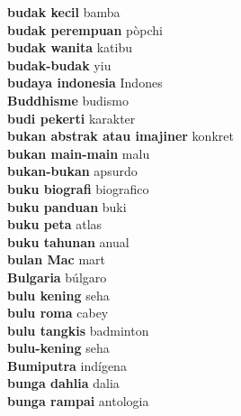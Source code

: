 \textbf{ budak kecil  } bamba \\
\textbf{ budak perempuan  } pòpchi \\
\textbf{ budak wanita  } katibu \\
\textbf{ budak-budak  } yiu \\
\textbf{ budaya indonesia  } Indones \\
\textbf{ Buddhisme  } budismo \\
\textbf{ budi pekerti  } karakter \\
\textbf{ bukan abstrak atau imajiner  } konkret \\
\textbf{ bukan main-main  } malu \\
\textbf{ bukan-bukan  } apsurdo \\
\textbf{ buku biografi  } biografico \\
\textbf{ buku panduan  } buki \\
\textbf{ buku peta  } atlas \\
\textbf{ buku tahunan  } anual \\
\textbf{ bulan Mac  } mart \\
\textbf{ Bulgaria  } búlgaro \\
\textbf{ bulu kening  } seha \\
\textbf{ bulu roma  } cabey \\
\textbf{ bulu tangkis  } badminton \\
\textbf{ bulu-kening  } seha \\
\textbf{ Bumiputra  } indígena \\
\textbf{ bunga dahlia  } dalia \\
\textbf{ bunga rampai  } antologia \\
